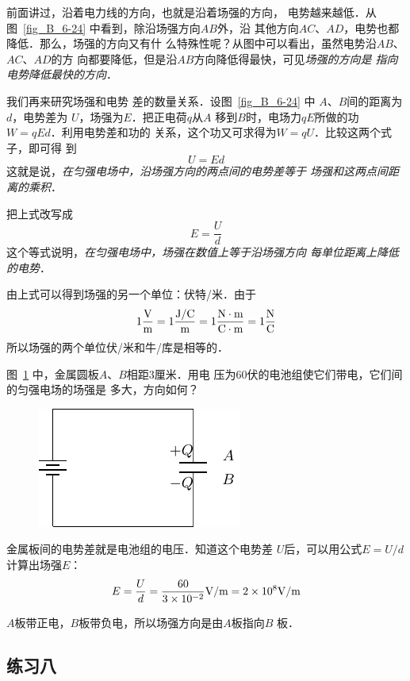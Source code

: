 前面讲过，沿着电力线的方向，也就是沿着场强的方向，
电势越来越低．从图~\ref{fig_B_6-24} 中看到，除沿场强方向$AB$外，沿
其他方向$AC$、$AD$，电势也都降低．那么，场强的方向又有什
么特殊性呢？从图中可以看出，虽然电势沿$AB$、$AC$、$AD$的方
向都要降低，但是沿$AB$方向降低得最快，可见\textit{场强的方向是
指向电势降低最快的方向}．

我们再来研究场强和电势
差的数量关系．设图~\ref{fig_B_6-24} 中
$A$、$B$间的距离为$d$，电势差为
$U$，场强为$E$．把正电荷$q$从$A$
移到$B$时，电场力$qE$所做的功
$W=qEd$．利用电势差和功的
关系，这个功又可求得为$W=qU$．比较这两个式子，即可得
到
\[U=Ed\]
这就是说，\textit{在匀强电场中，沿场强方向的两点间的电势差等于
场强和这两点间距离的乘积}．

把上式改写成
\[E=\frac{U}{d} \]
这个等式说明，\textit{在匀强电场中，场强在数值上等于沿场强方向
每单位距离上降低的电势}．

由上式可以得到场强的另一个单位：伏特/米．由于
\[1\frac{{\rm V}}{\rm m}=1\frac{{\rm J}/{\rm C}}{\rm m}=1\frac{{\rm N}\cdot {\rm m}}{{\rm C}\cdot {\rm m}}=1\frac{{\rm N}}{\rm C}  \]
所以场强的两个单位伏/米和牛/库是相等的．

\begin{example}
    图~\ref{fig_B_6-25} 中，金属圆板$A$、$B$相距3厘米．用电
压为60伏的电池组使它们带电，它们间的匀强电场的场强是
多大，方向如何？
\end{example}
\begin{figure}[htbp]
    \centering
    \includegraphics{fig/B/6-25.pdf}
    \caption{}\label{fig_B_6-25}
\end{figure}    

\begin{solution}
    金属板间的电势差就是电池组的电压．知道这个电势差
$U$后，可以用公式$E=U/d$计算出场强$E$：
\[E=\frac{U}{d}=\frac{60}{3\times 10^{-2}}{\rm V}/{\rm m}=2\times 10^8 {\rm V}/{\rm m}\]

$A$板带正电，$B$板带负电，所以场强方向是由$A$板指向$B$
板．
\end{solution}

\subsection*{练习八}

